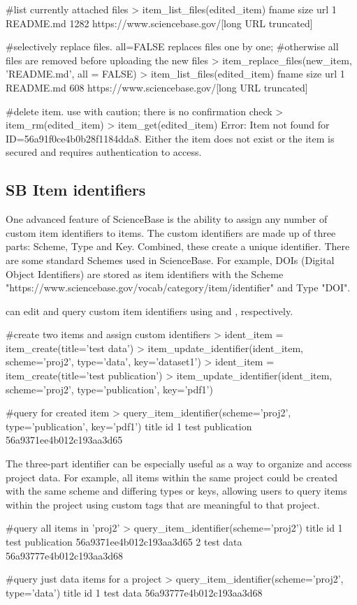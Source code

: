 \begin{example}
#list currently attached files
> item_list_files(edited_item)
      fname size     url
1 README.md 1282     https://www.sciencebase.gov/[long URL truncated]

#selectively replace files. all=FALSE replaces files one by one;
#otherwise all files are removed before uploading the new files
> item_replace_files(new_item, 'README.md', all = FALSE)
> item_list_files(edited_item)
      fname size     url
1 README.md 608     https://www.sciencebase.gov/[long URL truncated]

#delete item. use with caution; there is no confirmation check
> item_rm(edited_item)
> item_get(edited_item)
Error: Item not found for ID=56a91f0ce4b0b28f1184dda8. Either the item does
not exist or the item is secured and requires authentication to access.
\end{example}


\subsection{SB Item identifiers}
One advanced feature of ScienceBase is the ability to assign any
number of custom item identifiers to items. The custom identifiers are made up
of three parts: Scheme, Type and Key. Combined, these create a unique identifier.
There are some standard Schemes used in ScienceBase. For example, DOIs (Digital
Object Identifiers) are stored as item identifiers with the Scheme
"https://www.sciencebase.gov/vocab/category/item/identifier" and Type "DOI".

 can edit and query custom item identifiers using
 and ,
respectively.

\begin{example}
#create two items and assign custom identifiers
> ident_item = item_create(title='test data')
> item_update_identifier(ident_item, scheme='proj2', type='data', key='dataset1')
> ident_item = item_create(title='test publication')
> item_update_identifier(ident_item, scheme='proj2', type='publication', key='pdf1')

#query for created item
> query_item_identifier(scheme='proj2', type='publication', key='pdf1')
             title                       id
1 test publication 56a9371ee4b012c193aa3d65
\end{example}

The three-part identifier can be especially useful as a way to
organize and access project data. For example, all items within the same project
could be created with the same scheme and differing types or keys, allowing
users to query items within the project using custom tags that are meaningful to
that project.

\begin{example}
#query all items in 'proj2'
> query_item_identifier(scheme='proj2')
             title                       id
1 test publication 56a9371ee4b012c193aa3d65
2        test data 56a93777e4b012c193aa3d68

#query just data items for a project
> query_item_identifier(scheme='proj2', type='data')
      title                       id
1 test data 56a93777e4b012c193aa3d68
\end{example}

